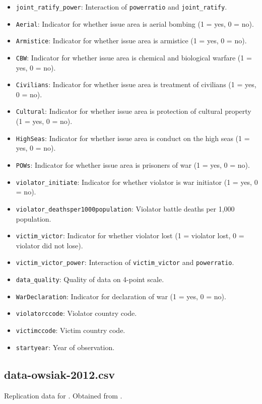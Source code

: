 \documentclass[12pt]{article}
\begin{document}
\begin{itemize}
  \item \texttt{joint\_ratify\_power}: Interaction of \texttt{powerratio} and \texttt{joint\_ratify}.
  \item \texttt{Aerial}: Indicator for whether issue area is aerial bombing (1 = yes, 0 = no).
  \item \texttt{Armistice}: Indicator for whether issue area is armistice (1 = yes, 0 = no).
  \item \texttt{CBW}: Indicator for whether issue area is chemical and biological warfare (1 = yes, 0 = no).
  \item \texttt{Civilians}: Indicator for whether issue area is treatment of civilians (1 = yes, 0 = no).
  \item \texttt{Cultural}: Indicator for whether issue area is protection of cultural property (1 = yes, 0 = no).
  \item \texttt{HighSeas}: Indicator for whether issue area is conduct on the high seas (1 = yes, 0 = no).
  \item \texttt{POWs}: Indicator for whether issue area is prisoners of war (1 = yes, 0 = no).
  \item \texttt{violator\_initiate}: Indicator for whether violator is war initiator (1 = yes, 0 = no).
  \item \texttt{violator\_deathsper1000population}: Violator battle deaths per 1,000 population.
  \item \texttt{victim\_victor}: Indicator for whether violator lost (1 = violator lost, 0 = violator did not lose).
  \item \texttt{victim\_victor\_power}: Interaction of \texttt{victim\_victor} and \texttt{powerratio}.
  \item \texttt{data\_quality}: Quality of data on 4-point scale.
  \item \texttt{WarDeclaration}: Indicator for declaration of war (1 = yes, 0 = no).
  \item \texttt{violatorccode}: Violator country code.
  \item \texttt{victimccode}: Victim country code.
  \item \texttt{startyear}: Year of observation.
\end{itemize}

\subsection{data-owsiak-2012.csv}

Replication data for \citet{Owsiak:2012dx}.
Obtained from \citet{owsiak2012data}.
\end{document}
